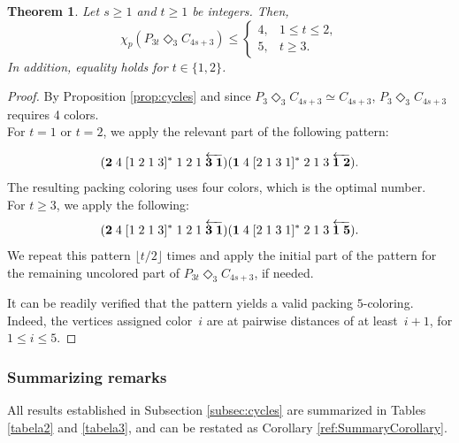 \documentclass{article}
\newtheorem{theorem}{Theorem}
\begin{document}
\begin{theorem}
    Let $s\geq 1$ and $t \geq 1$ be integers. Then,
 $$\chi_p(P_{3t}\Diamond_3 C_{4s+3})\leq\left\{
\begin{array}{ll}
4, & 1 \leq t \leq 2,\\
5, & t\geq 3.
\end{array}\right.
$$  
In addition, equality holds for $t\in\{1,2\}$. 
\end{theorem}
\begin{proof}
    By Proposition \ref{prop:cycles} and since $P_{3}\Diamond_3 C_{4s+3} \simeq C_{4s+3}$, $P_{3}\Diamond_3 C_{4s+3}$ requires 4 colors.
    \\For $t=1$ or $t=2$, we apply the relevant part of the following pattern:

    $$({\bf 2}\; 4\; [1\;2\;1\;3]^*\; 1\; 2\; 1\; \overleftarrow{{\bf 3\; 1}})({\bf 1}\; 4\; [2\;1\;3\;1]^*\;2\;1\;3\; \overleftarrow{{\bf 1\; 2}}).$$
  The resulting packing coloring uses four colors, which is the optimal number.
    \\For $t\geq 3$, we apply the following:
    $$({\bf 2}\; 4\; [1\;2\;1\;3]^*\; 1\; 2\; 1\; \overleftarrow{{\bf 3\; 1}})({\bf 1}\; 4\; [2\;1\;3\;1]^*\;2\;1\;3\; \overleftarrow{{\bf 1\; 5}}).$$
    We repeat this pattern $\lfloor t/2 \rfloor$ times and apply the initial part of the pattern for the remaining uncolored part of $P_{3t}\Diamond_3 C_{4s+3}$, if needed.

 It can be readily verified that the pattern yields a valid packing $5$-coloring. Indeed, the vertices assigned color~$i$ are at pairwise distances of at least~$i+1$, for $1 \leq i \leq 5$. %
 
\end{proof}


\subsubsection{Summarizing remarks}

All results established in Subsection \ref{subsec:cycles} are summarized in Tables \ref{tabela2} and \ref{tabela3}, and can be restated as Corollary \ref{ref:SummaryCorollary}.
\end{document}
